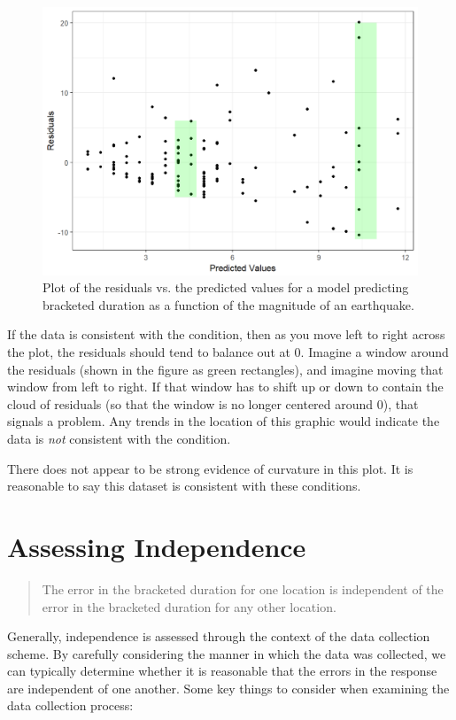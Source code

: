 \documentclass[]{book}
\theoremstyle{plain}
\theoremstyle{mydefn}
\theoremstyle{myexmpl}
\theoremstyle{remark}
\begin{document}
\begin{figure}

{\centering \includegraphics[width=0.8\linewidth]{./Images/regassessment-mean0-1} 

}

\caption{Plot of the residuals vs. the predicted values for a model predicting bracketed duration as a function of the magnitude of an earthquake.}\label{fig:regassessment-mean0}
\end{figure}

If the data is consistent with the condition, then as you move left to
right across the plot, the residuals should tend to balance out at 0.
Imagine a window around the residuals (shown in the figure as green
rectangles), and imagine moving that window from left to right. If that
window has to shift up or down to contain the cloud of residuals (so
that the window is no longer centered around 0), that signals a problem.
Any trends in the location of this graphic would indicate the data is
\emph{not} consistent with the condition.

There does not appear to be strong evidence of curvature in this plot.
It is reasonable to say this dataset is consistent with these
conditions.

\section{Assessing Independence}\label{assessing-independence}

\begin{quote}
The error in the bracketed duration for one location is independent of
the error in the bracketed duration for any other location.
\end{quote}

Generally, independence is assessed through the context of the data
collection scheme. By carefully considering the manner in which the data
was collected, we can typically determine whether it is reasonable that
the errors in the response are independent of one another. Some key
things to consider when examining the data collection process:
\end{document}
